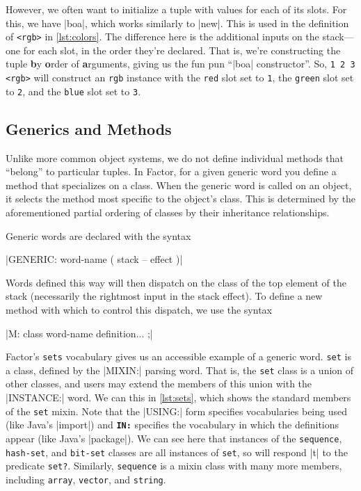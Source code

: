 
However, we often want to initialize a tuple with values for each of its slots.
For this, we have \factor|boa|, which works similarly to \factor|new|.  This is
used in the definition of \Verb|<rgb>| in \vref{lst:colors}.  The difference
here is the additional inputs on the stack---one for each slot, in the order
they're declared.  That is, we're constructing the tuple \textbf{b}y
\textbf{o}rder of \textbf{a}rguments, giving us the fun pun ``\factor|boa|
constructor''.  So, \Verb|1 2 3 <rgb>| will construct an \Verb|rgb|
instance with the \Verb|red| slot set to \Verb|1|, the \Verb|green| slot
set to \Verb|2|, and the \Verb|blue| slot set to \Verb|3|.

\subsection{Generics and Methods}

Unlike more common object systems, we do not define individual methods that
``belong'' to particular tuples.  In Factor, for a given generic word you
define a method that specializes on a class.  When the generic word is called
on an object, it selects the method most specific to the object's class.  This
is determined by the aforementioned partial ordering of classes by their
inheritance relationships.

Generic words are declared with the syntax
%
\begin{center} \factor|GENERIC: word-name ( stack -- effect )| \end{center}
%
Words defined this way will then dispatch on the class of the top element of
the stack (necessarily the rightmost input in the stack effect).  To define a
new method with which to control this dispatch, we use the syntax
%
\begin{center} \factor|M: class word-name definition... ;| \end{center}

Factor's \Verb|sets| vocabulary gives us an accessible example of a generic
word.  \Verb|set| is a  class, defined by the \factor|MIXIN:|
parsing word.  That is, the \Verb|set| class is a union of other classes, and
users may extend the members of this union with the \factor|INSTANCE:| word.
We can this in \vref{lst:sets}, which shows the standard members of the
\Verb|set| mixin.  Note that the \factor|USING:| form specifies vocabularies
being used (like Java's |import|) and \texttt{\textbf{IN:}}
specifies the vocabulary in which the definitions appear (like Java's
|package|).  We can see here that instances of the \Verb|sequence|,
\Verb|hash-set|, and \Verb|bit-set| classes are all instances of \Verb|set|, so
will respond \factor|t| to the predicate \Verb|set?|.  Similarly,
\Verb|sequence| is a mixin class with many more members, including
\Verb|array|, \Verb|vector|, and \Verb|string|.

